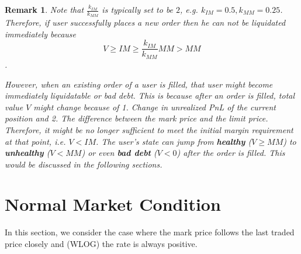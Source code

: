 \documentclass[notitlepage,reqno,11pt]{amsart}
\numberwithin{equation}{section}
\newtheorem{remark}{Remark}[section]
\begin{document}
\begin{remark}
    Note that $\frac{k_{IM}}{k_{MM}}$ is typically set to be $2$, e.g. $k_{IM} = 0.5, k_{MM} = 0.25$. Therefore, if user successfully places a new order then he can not be liquidated immediately because $$V\geq IM\geq \frac{k_{IM}}{k_{MM}} MM > MM$$.

    However, when an existing order of a user is filled, that user might become immediately liquidatable or bad debt. This is because after an order is filled, total value $V$ might change because of 1. Change in unrealized PnL of the current position and 2. The difference between the mark price and the limit price. Therefore, it might be no longer sufficient to meet the initial margin requirement at that point, i.e. $V < IM$. The user's state can jump from \textbf{healthy} ($V \geq MM$) to \textbf{unhealthy} ($V < MM$) or even \textbf{bad debt} ($V < 0$) after the order is filled. This would be discussed in the following sections.
\end{remark}
\section{Normal Market Condition}

In this section, we consider the case where the mark price follows the last traded price closely and (WLOG) the rate is always positive.
\end{document}
